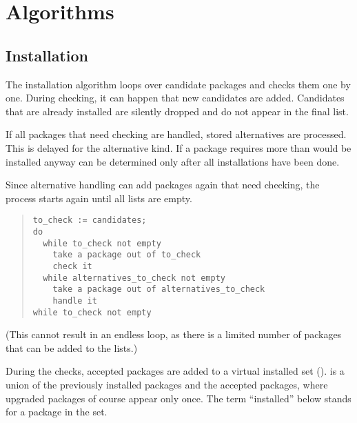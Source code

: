 \documentclass[10pt]{article}
\begin{document}
\section{Algorithms}


\subsection{Installation}

The installation algorithm loops over candidate packages and checks
them one by one. During checking, it can happen that new candidates
are added. Candidates that are already installed are silently dropped
and do not appear in the final  list.

If all packages that need checking are handled, stored alternatives
are processed. This is delayed for the  alternative
kind. If a package requires more than would be installed anyway can be
determined only after all installations have been done.

Since alternative handling can add packages again that need checking,
the process starts again until all lists are empty.

\begin{quote}
\begin{verbatim}
to_check := candidates;
do
  while to_check not empty
    take a package out of to_check
    check it
  while alternatives_to_check not empty
    take a package out of alternatives_to_check
    handle it
while to_check not empty
\end{verbatim}
\end{quote}

(This cannot result in an endless loop, as there is a limited number
of packages that can be added to the  lists.)

During the checks, accepted packages are added to a virtual installed
set ().  is a union of the previously
installed packages and the accepted packages, where upgraded packages
of course appear only once. The term ``installed'' below stands for a
package in the  set.
\end{document}

